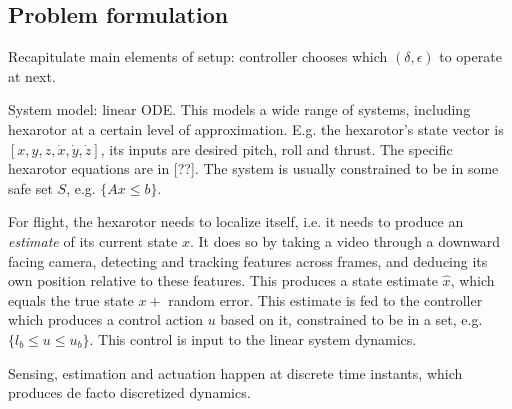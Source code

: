 \subsection{Problem formulation}
\label{formulation}

Recapitulate main elements of setup: controller chooses which $(\delta,\epsilon)$ to operate at next.

System model: linear ODE. 
This models a wide range of systems, including hexarotor at a certain level of approximation.
E.g. the hexarotor's state vector is $[x,y,z,\dot{x},\dot{y},\dot{z}]$,
its inputs are desired pitch, roll and thrust.
The specific hexarotor equations are in [??].
The system is usually constrained to be in some safe set $S$, e.g. $\{Ax \leq b\}$.

For flight, the hexarotor needs to localize itself, i.e. it needs to produce an \emph{estimate} of its current state $x$.
It does so by taking a video through a downward facing camera, detecting and tracking features across frames, and deducing its own position relative to these features.
This produces a state estimate $\hat{x}$, which equals the true state $x + $ random error.
This estimate is fed to the controller which produces a control action $u$ based on it, constrained to be in a set, e.g. $\{l_b \leq u \leq u_b\}$.
This control is input to the linear system dynamics.

Sensing, estimation and actuation happen at discrete time instants, which produces de facto discretized dynamics.





